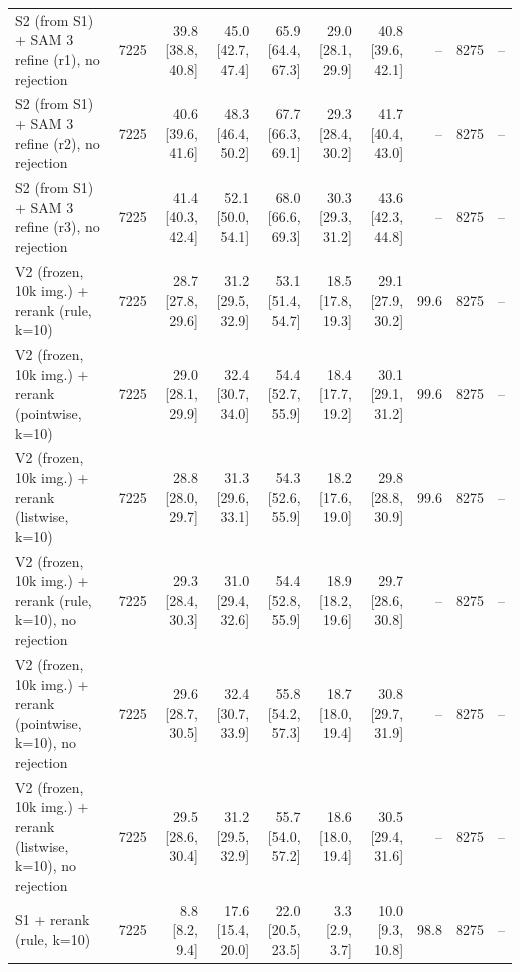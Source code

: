 \begin{tabular}{lrrrrrrrrr}
\midrule
S2 (from S1) + SAM 3 refine (r1), no rejection & 7225 & 39.8 \scriptsize{[38.8, 40.8]} & 45.0 \scriptsize{[42.7, 47.4]} & 65.9 \scriptsize{[64.4, 67.3]} & 29.0 \scriptsize{[28.1, 29.9]} & 40.8 \scriptsize{[39.6, 42.1]} & -- & 8275 & -- \\
S2 (from S1) + SAM 3 refine (r2), no rejection & 7225 & 40.6 \scriptsize{[39.6, 41.6]} & 48.3 \scriptsize{[46.4, 50.2]} & 67.7 \scriptsize{[66.3, 69.1]} & 29.3 \scriptsize{[28.4, 30.2]} & 41.7 \scriptsize{[40.4, 43.0]} & -- & 8275 & -- \\
S2 (from S1) + SAM 3 refine (r3), no rejection & 7225 & 41.4 \scriptsize{[40.3, 42.4]} & 52.1 \scriptsize{[50.0, 54.1]} & 68.0 \scriptsize{[66.6, 69.3]} & 30.3 \scriptsize{[29.3, 31.2]} & 43.6 \scriptsize{[42.3, 44.8]} & -- & 8275 & -- \\
\midrule
V2 (frozen, 10k img.) + rerank (rule, k=10) & 7225 & 28.7 \scriptsize{[27.8, 29.6]} & 31.2 \scriptsize{[29.5, 32.9]} & 53.1 \scriptsize{[51.4, 54.7]} & 18.5 \scriptsize{[17.8, 19.3]} & 29.1 \scriptsize{[27.9, 30.2]} & 99.6 & 8275 & -- \\
V2 (frozen, 10k img.) + rerank (pointwise, k=10) & 7225 & 29.0 \scriptsize{[28.1, 29.9]} & 32.4 \scriptsize{[30.7, 34.0]} & 54.4 \scriptsize{[52.7, 55.9]} & 18.4 \scriptsize{[17.7, 19.2]} & 30.1 \scriptsize{[29.1, 31.2]} & 99.6 & 8275 & -- \\
V2 (frozen, 10k img.) + rerank (listwise, k=10) & 7225 & 28.8 \scriptsize{[28.0, 29.7]} & 31.3 \scriptsize{[29.6, 33.1]} & 54.3 \scriptsize{[52.6, 55.9]} & 18.2 \scriptsize{[17.6, 19.0]} & 29.8 \scriptsize{[28.8, 30.9]} & 99.6 & 8275 & -- \\
\midrule
V2 (frozen, 10k img.) + rerank (rule, k=10), no rejection & 7225 & 29.3 \scriptsize{[28.4, 30.3]} & 31.0 \scriptsize{[29.4, 32.6]} & 54.4 \scriptsize{[52.8, 55.9]} & 18.9 \scriptsize{[18.2, 19.6]} & 29.7 \scriptsize{[28.6, 30.8]} & -- & 8275 & -- \\
V2 (frozen, 10k img.) + rerank (pointwise, k=10), no rejection & 7225 & 29.6 \scriptsize{[28.7, 30.5]} & 32.4 \scriptsize{[30.7, 33.9]} & 55.8 \scriptsize{[54.2, 57.3]} & 18.7 \scriptsize{[18.0, 19.4]} & 30.8 \scriptsize{[29.7, 31.9]} & -- & 8275 & -- \\
V2 (frozen, 10k img.) + rerank (listwise, k=10), no rejection & 7225 & 29.5 \scriptsize{[28.6, 30.4]} & 31.2 \scriptsize{[29.5, 32.9]} & 55.7 \scriptsize{[54.0, 57.2]} & 18.6 \scriptsize{[18.0, 19.4]} & 30.5 \scriptsize{[29.4, 31.6]} & -- & 8275 & -- \\
\midrule
S1 + rerank (rule, k=10) & 7225 & 8.8 \scriptsize{[8.2, 9.4]} & 17.6 \scriptsize{[15.4, 20.0]} & 22.0 \scriptsize{[20.5, 23.5]} & 3.3 \scriptsize{[2.9, 3.7]} & 10.0 \scriptsize{[9.3, 10.8]} & 98.8 & 8275 & -- \\

\end{tabular}
